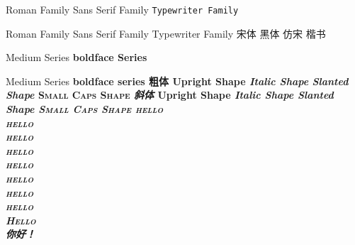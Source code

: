 \documentclass[12pt, a4paper, onneside]{ctexart}
\begin{document}
	\textrm{Roman Family}	%
	\textsf{Sans Serif Family}
	\texttt{Typewriter Family}
	
	\rmfamily Roman Family	%
	\sffamily Sans Serif Family
	\ttfamily Typewriter Family
	\songti 宋体
	\heiti 黑体
	\fangsong 仿宋
	\kaishu 楷书
	
	\textmd{Medium Series}	%
	\textbf{boldface Series} %
	
	\mdseries Medium Series
	\bfseries boldface series
	\textbf{粗体}
	\textup{Upright Shape}	%
	\textit{Italic Shape}	%
	\textsl{Slanted Shape}	%
	\textsc{Small Caps Shape}	%
	\textit{斜体}
	\upshape Upright Shape
	\itshape Italic Shape
	\slshape Slanted Shape
	\scshape Small Caps Shape
	{\tiny hello}\\
	{\scriptsize hello}\\
	{\small hello}\\
	{\normalsize hello}\\
	{\large hello}\\
	{\Large hello}\\
	{\LARGE hello}\\
	{\huge hello}\\
	{\Huge Hello}\\
	 你好！%
\end{document}
